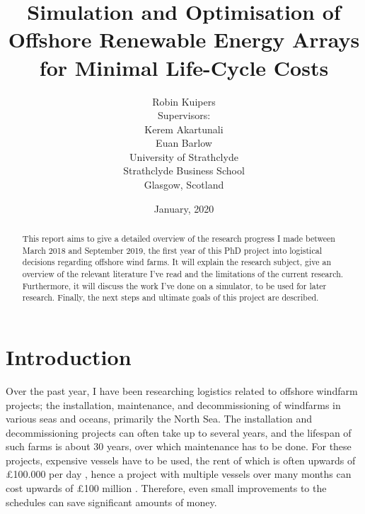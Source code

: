 \documentclass[a4paper,12pt]{article}
\begin{document}
\title{Simulation and Optimisation of Offshore Renewable Energy Arrays for Minimal Life-Cycle Costs}
\author{Robin Kuipers \\[1cm] Supervisors: \\ Kerem Akartunali \\ Euan Barlow\\[2cm] University of Strathclyde \\ Strathclyde Business School \\ {\small Glasgow, Scotland}}
\date{January, 2020}

\maketitle

\pagebreak

\begin{abstract}
This report aims to give a detailed overview of the research progress I made between March 2018 and September 2019, the first year of this PhD project into logistical decisions regarding offshore wind farms. It will explain the research subject, give an overview of the relevant literature I've read and the limitations of the current research. Furthermore, it will discuss the work I've done on a simulator, to be used for later research. Finally, the next steps and ultimate goals of this project are described. 
\end{abstract}

\pagebreak

\tableofcontents

\pagebreak

\section{Introduction} \label{s:intro}
Over the past year, I have been researching logistics related to offshore windfarm projects; the installation, maintenance, and decommissioning of windfarms in various seas and oceans, primarily the North Sea. The installation and decommissioning projects can often take up to several years, and the lifespan of such farms is about 30 years, over which maintenance has to be done. For these projects, expensive vessels have to be used, the rent of which is often upwards of \pounds 100.000 per day \cite{barlow2014support}, hence a project with multiple vessels over many months can cost upwards of \pounds 100 million \cite{kaiser2010offshore}. Therefore, even small improvements to the schedules can save significant amounts of money.
\end{document}
